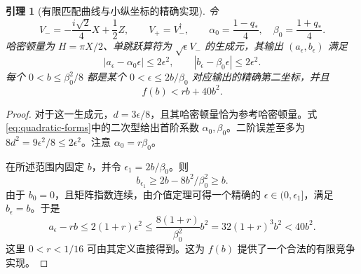\documentclass[UTF8,11pt,a4paper,fontset=fandol]{ctexart}
\newtheorem{lemma}[theorem]{引理}
\theoremstyle{definition}
\theoremstyle{remark}
\begin{document}
\begin{lemma}[有限匹配曲线与小纵坐标的精确实现]\label{lem:matching}
令
\begin{equation}\label{eq:matching-jumps}
 V_-=-\frac{i\sqrt2}{4}X+\frac12Z,\qquad V_+=V_-^\dagger,
 \qquad \alpha_0=\frac{1-q_*}{4},\quad \beta_0=\frac{1+q_*}{4}.
\end{equation}
哈密顿量为 \(H=\pi X/2\)、单跳跃算符为 \(\sqrt\epsilon V_-\) 的生成元，其输出 \((a_\epsilon,b_\epsilon)\) 满足
\begin{equation}\label{eq:matching-errors}
 |a_\epsilon-\alpha_0\epsilon|\leq2\epsilon^2,
 \qquad |b_\epsilon-\beta_0\epsilon|\leq2\epsilon^2.
\end{equation}
每个 \(0<b\leq\beta_0^2/8\) 都是某个 \(0<\epsilon\leq2b/\beta_0\) 对应输出的精确第二坐标，并且
\begin{equation}\label{eq:matching-upper}
 f(b)<rb+40b^2.
\end{equation}
\end{lemma}
\begin{proof}
对于这一生成元，\(d=3\epsilon/8\)，且其哈密顿量恰为参考哈密顿量。式\eqref{eq:quadratic-forms}中的二次型给出首阶系数 \(\alpha_0,\beta_0\)。二阶误差至多为 \(8d^2=9\epsilon^2/8\leq2\epsilon^2\)。注意 \(\alpha_0=r\beta_0\)。

在所述范围内固定 \(b\)，并令 \(\epsilon_1=2b/\beta_0\)。则
\[
 b_{\epsilon_1}\geq2b-8b^2/\beta_0^2\geq b.
\]
由于 \(b_0=0\)，且矩阵指数连续，由介值定理可得一个精确的 \(\epsilon\in(0,\epsilon_1]\)，满足 \(b_\epsilon=b\)。于是
\[
 a_\epsilon-rb\leq2(1+r)\epsilon^2
 \leq\frac{8(1+r)}{\beta_0^2}b^2
 =32(1+r)^3b^2<40b^2.
\]
这里 \(0<r<1/16\) 可由其定义直接得到。这为 \(f(b)\) 提供了一个合法的有限竞争实现。
\end{proof}
\end{document}

